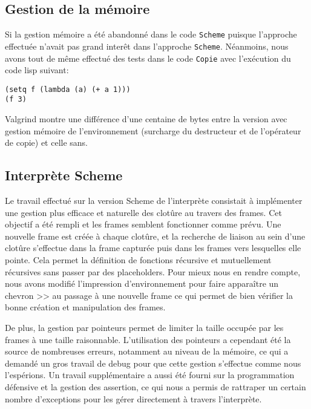 \documentclass[a4paper,11pt]{article}
\begin{document}
\subsection{Gestion de la mémoire}

Si la gestion mémoire a été abandonné dans le code \texttt{Scheme} puisque l'approche
effectuée n'avait pas grand interêt dans l'approche \texttt{Scheme}. Néanmoins,
nous avons tout de même effectué des tests dans le code \texttt{Copie} avec
l'exécution du
code lisp suivant:

\begin{lstlisting}
(setq f (lambda (a) (+ a 1)))
(f 3)
\end{lstlisting}

Valgrind montre une différence d'une centaine de bytes entre la version avec
gestion mémoire de l'environnement (surcharge du destructeur et de l'opérateur
de copie) et celle sans.

 \subsection{Interprète Scheme}

 Le travail effectué sur la version Scheme de l'interprète consistait à implémenter 
 une gestion plus efficace et naturelle des clotûre au travers des frames. Cet 
 objectif a été rempli et les frames semblent fonctionner comme prévu. Une nouvelle
 frame est créée à chaque clotûre, et la recherche de liaison au sein d'une clotûre 
 s'effectue dans la frame capturée puis dans les frames vers lesquelles elle pointe. 
 Cela permet la définition de fonctions récursive et mutuellement récursives sans 
 passer par des placeholders. Pour mieux nous en rendre compte, nous avons
 modifié l'impression d'environnement pour faire apparaître un chevron >> au
 passage à une nouvelle frame ce qui permet de bien vérifier la bonne création
 et manipulation des frames.
 
 De plus, la gestion par pointeurs permet de limiter la taille occupée par les frames 
 à une taille raisonnable. L'utilisation des pointeurs a cependant été la source de 
 nombreuses erreurs, notamment au niveau de la mémoire, ce qui a demandé un gros 
 travail de debug pour que cette gestion s'effectue comme nous l'espérions. Un travail 
 supplémentaire a aussi été fourni sur la programmation défensive et la gestion des
 assertion, ce qui nous a permis de rattraper un certain nombre d'exceptions pour les 
 gérer directement à travers l'interprète.
\end{document}
